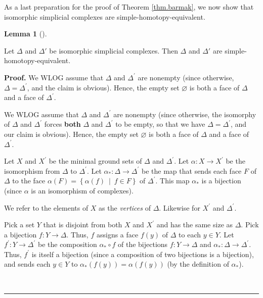 \documentclass[numbers=enddot,12pt,final,onecolumn,notitlepage]{scrartcl}%
\theoremstyle{definition}
\newtheorem{lem}[theo]{Lemma}
\newenvironment{lemma}[1][]
{\begin{lem}[#1]\begin{leftbar}}
{\end{leftbar}\end{lem}}
\newenvironment{proof}[1][Proof]{\noindent\textbf{#1.} }{\ \rule{0.5em}{0.5em}}
\newenvironment{verlong}{}{}
\newenvironment{vershort}{}{}
\begin{document}
As a last preparation for the proof of Theorem \ref{thm.barmak}, we now show that isomorphic
simplicial complexes are simple-homotopy-equivalent.

\begin{lemma}
  \label{lem.isomorphic.simple.homotopy.type}
  Let $\Delta$ and $\Delta'$ be isomorphic simplicial complexes. Then $\Delta$ and $\Delta'$ are
  simple-homotopy-equivalent.
\end{lemma}

\begin{proof}
\begin{vershort}
We WLOG assume that $\Delta$ and $\Delta^{\prime}$ are nonempty (since
otherwise, $\Delta=\Delta^{\prime}$, and the claim is obvious). Hence, the
empty set $\varnothing$ is both a face of $\Delta$ and a face of
$\Delta^{\prime}$.
\end{vershort}

\begin{verlong}
We WLOG assume that $\Delta$ and $\Delta^{\prime}$ are nonempty (since
otherwise, the isomorphy of $\Delta$ and $\Delta^{\prime}$ forces
\textbf{both} $\Delta$ and $\Delta^{\prime}$ to be empty, so that we have
$\Delta=\Delta^{\prime}$, and our claim is obvious). Hence, the empty set
$\varnothing$ is both a face of $\Delta$ and a face of $\Delta^{\prime}$.
\end{verlong}

Let $X$ and $X^{\prime}$ be the minimal ground sets of $\Delta$ and
$\Delta^{\prime}$. Let $\alpha:X\rightarrow X^{\prime}$ be the isomorphism
from $\Delta$ to $\Delta^{\prime}$. Let $\alpha_{\ast}:\Delta\rightarrow
\Delta^{\prime}$ be the map that sends each face $F$ of $\Delta$ to the face
$\alpha\left(  F\right)  =\left\{  \alpha\left(  f\right)  \ \mid\ f\in
F\right\}  $ of $\Delta^{\prime}$. This map $\alpha_{\ast}$ is a bijection
(since $\alpha$ is an isomorphism of complexes).

We refer to the elements of $X$ as the \emph{vertices} of $\Delta$. Likewise
for $X^{\prime}$ and $\Delta^{\prime}$.

Pick a set $Y$ that is disjoint from both $X$ and $X^{\prime}$ and has the
same size as $\Delta$. Pick a bijection $f\colon Y\rightarrow\Delta$. Thus,
$f$ assigns a face $f\left(  y\right)  $ of $\Delta$ to each $y\in Y$. Let
$f^{\prime}:Y\rightarrow\Delta^{\prime}$ be the composition $\alpha_{\ast
}\circ f$ of the bijections $f:Y\rightarrow\Delta$ and $\alpha_{\ast}%
:\Delta\rightarrow\Delta^{\prime}$.
Thus, $f^{\prime}$ is itself a bijection (since a composition of two
bijections is a bijection), and sends each $y\in Y$ to $\alpha_{\ast}\left(
f\left(  y\right)  \right)  =\alpha\left(  f\left(  y\right)  \right)  $ (by
the definition of $\alpha_{\ast}$).


\end{proof}
\end{document}
